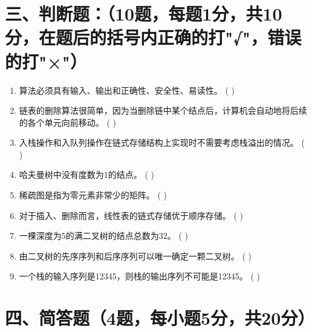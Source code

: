 \documentclass{../../note}
\begin{document}
\vspace{1cm}


\section*{三、判断题：（10题，每题1分，共10分，在题后的括号内正确的打"√"，错误的打"×"）}

\begin{enumerate}
\item 算法必须具有输入、输出和正确性、安全性、易读性。 ( \hspace{0.5cm} )

\item 链表的删除算法很简单，因为当删除链中某个结点后，计算机会自动地将后续的各个单元向前移动。 ( \hspace{0.5cm} )

\item 入栈操作和入队列操作在链式存储结构上实现时不需要考虑栈溢出的情况。 ( \hspace{0.5cm} )

\item 哈夫曼树中没有度数为1的结点。 ( \hspace{0.5cm} )

\item 稀疏图是指为零元素非常少的矩阵。 ( \hspace{0.5cm} )

\item 对于插入、删除而言，线性表的链式存储优于顺序存储。 ( \hspace{0.5cm} )

\item 一棵深度为5的满二叉树的结点总数为32。 ( \hspace{0.5cm} )

\item 由二叉树的先序序列和后序序列可以唯一确定一颗二叉树。 ( \hspace{0.5cm} )

\item 一个栈的输入序列是12345，则栈的输出序列不可能是12345。 ( \hspace{0.5cm} )
\end{enumerate}

\vspace{1cm}


\section*{四、简答题（4题，每小题5分，共20分）}
\end{document}
